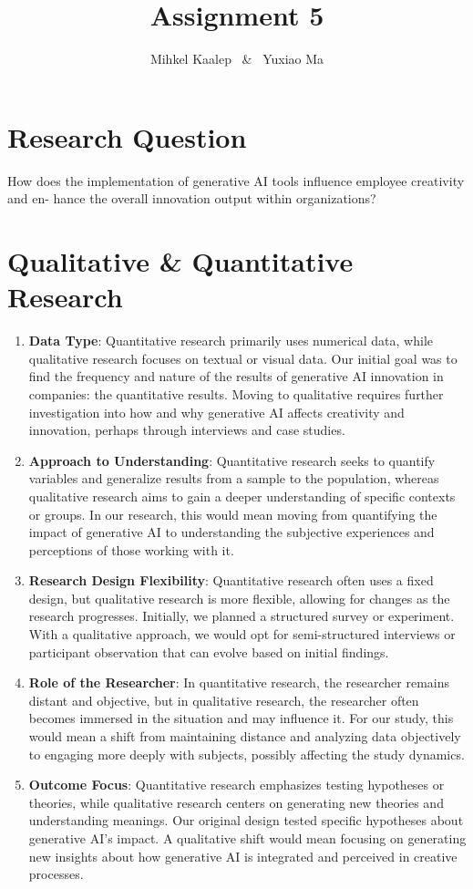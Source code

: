 \documentclass[UTF8,a4paper,AutoFakeBold,AutoFakeSlant]{article}
\title{\textbf{\textsf{{\textsf{Assignment 5}}}}}
\author{\tnewroman Mihkel Kaalep ~\&~ Yuxiao Ma}
\date{}
\begin{document}
\maketitle


\section{Research Question}

How does the implementation of generative AI tools influence employee creativity and en- hance the overall innovation output within organizations?


\section{Qualitative \& Quantitative Research}

\begin{enumerate}
    \item \textbf{Data Type}: Quantitative research primarily uses numerical data, while qualitative research focuses on textual or visual data. Our initial goal was to find the frequency and nature of the results of generative AI innovation in companies: the quantitative results. Moving to qualitative requires further investigation into how and why generative AI affects creativity and innovation, perhaps through interviews and case studies.
    \item \textbf{Approach to Understanding}: Quantitative research seeks to quantify variables and generalize results from a sample to the population, whereas qualitative research aims to gain a deeper understanding of specific contexts or groups. In our research, this would mean moving from quantifying the impact of generative AI to understanding the subjective experiences and perceptions of those working with it.
    \item \textbf{Research Design Flexibility}: Quantitative research often uses a fixed design, but qualitative research is more flexible, allowing for changes as the research progresses. Initially, we planned a structured survey or experiment. With a qualitative approach, we would opt for semi-structured interviews or participant observation that can evolve based on initial findings.
    \item \textbf{Role of the Researcher}: In quantitative research, the researcher remains distant and objective, but in qualitative research, the researcher often becomes immersed in the situation and may influence it. For our study, this would mean a shift from maintaining distance and analyzing data objectively to engaging more deeply with subjects, possibly affecting the study dynamics.
    \item \textbf{Outcome Focus}: Quantitative research emphasizes testing hypotheses or theories, while qualitative research centers on generating new theories and understanding meanings. Our original design tested specific hypotheses about generative AI's impact. A qualitative shift would mean focusing on generating new insights about how generative AI is integrated and perceived in creative processes.
\end{enumerate}
\end{document}
